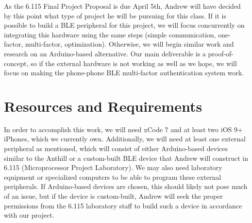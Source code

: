 \documentclass[twoside]{article}
\begin{document}
\begin{multicols}{2}
As the 6.115 Final Project Proposal is due April 5th, Andrew will have decided by this point what type
of project he will be pursuing for this class. If it is possible to build a BLE peripheral for this project,
we will focus concurrently on integrating this hardware using the same steps (simple communication,
one-factor, multi-factor, optimization). Otherwise, we will begin similar work and research on an Arduino-based
alternative. Our main deliverable is a proof-of-concept, so if the external hardware is not working as well
as we hope, we will focus on making the phone-phone BLE multi-factor authentication system work.


\section{Resources and Requirements}

In order to accomplish this work, we will need xCode 7 and at least two iOS 9+ iPhones, which we
currently own. Additionally, we will need at least one external peripheral as mentioned,
which will consist of either Arduino-based devices similar to the Anthill or a custom-built
BLE device that Andrew will construct in 6.115 (Microprocessor Project Laboratory). We may
also need laboratory equipment or specialized computers to be able to program these external
peripherals. If Arduino-based devices are chosen, this should likely not pose much of an issue,
but if the device is custom-built, Andrew will seek the proper permissions from the 6.115 laboratory
staff to build such a device in accordance with our project.

\end{multicols}
\end{document}
